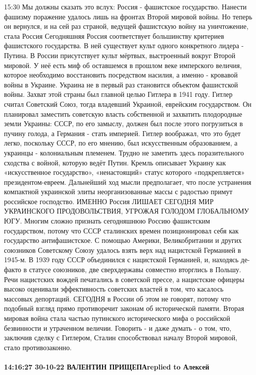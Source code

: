 15:30
Мы должны сказать это вслух:
Россия - фашистское государство.
Нанести фашизму поражение удалось лишь на фронтах Второй мировой войны. Но теперь он вернулся, и на сей раз страной, ведущей фашистскую войну на уничтожение, стала Россия
Сегодняшняя Россия соответствует большинству критериев фашистского государства. В ней существует культ одного конкретного лидера - Путина. В России присутствует культ мёртвых, выстроенный вокруг Второй мировой. У неё есть миф об оставшемся в прошлом веке имперского величия, которое необходимо восстановить посредством насилия, а именно - кровавой войны в Украине.
Украина не в первый раз становится объектом фашистской войны. Захват этой страны был главной целью Гитлера в 1941 году. Гитлер считал Советский Союз, тогда владевший Украиной, еврейским государством. Он планировал заместить советскую власть собственной и захватить плодородные земли Украины: СССР, по его замыслу, должен был после этого погрузиться в пучину голода, а Германия - стать империей. Гитлер воображал, что это будет легко, поскольку СССР, по его мнению, был искусственным образованием, а украинцы - колониальным племенем.
Трудно не заметить здесь поразительного сходства с войной, которую ведёт Путин.
Кремль описывает Украину как «искусственное государство», «ненастоящий» статус которого «подкрепляется» президентом-евреем. Дальнейший ход мысли предполагает, что после устранения компактной украинской элиты неорганизованные массы с радостью примут российское господство.
ИМЕННО
Россия ЛИШАЕТ СЕГОДНЯ МИР УКРАИНСКОГО ПРОДОВОЛЬСТВИЯ, УГРОЖАЯ ГОЛОДОМ ГЛОБАЛЬНОМУ ЮГУ.
Многим сложно признать сегодняшнюю Россию фашистским государством, потому что СССР сталинских времен позиционировал себя как государство антифашистское. С помощью Америки, Великобритании и других союзников Советскому Союзу удалось взять верх над нацистской Германией в 1945-м.
В 1939 году СССР объединился с нацистской Германией, и, находясь де-факто в статусе союзников, две сверхдержавы совместно вторглись в Польшу. Речи нацистских вождей печатались в советской прессе, а нацистские офицеры высоко оценивали эффективность советских властей в том, что касалось массовых депортаций. СЕГОДНЯ в России об этом не говорят, потому что подобный взгляд прямо противоречит законам об исторической памяти. Вторая мировая война стала частью путинского исторического мифа о российской безвинности и утраченном величии.
Говорить - и даже думать - о том, что, заключив сделку с Гитлером, Сталин способствовал началу Второй мировой, стало противозаконно.

\paragraph{14:16:27 30-10-22 ВАЛЕНТИН ПРИЩЕПАreplied to Алексей}

